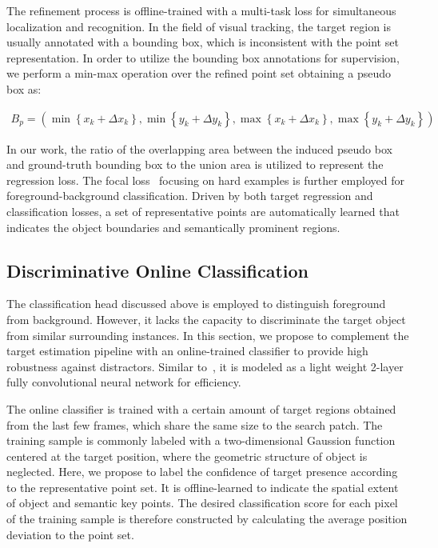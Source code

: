\documentclass[runningheads]{llncs}
\begin{document}
The refinement process is offline-trained with a multi-task loss for
simultaneous localization and recognition. In the field of visual
tracking, the target region is usually annotated with a bounding box,
which is inconsistent with the point set representation. In order to
utilize the bounding box annotations for supervision, we perform a
min-max operation over the refined point set obtaining a pseudo
box as:

\begin{align}
B_{p} = \left( \min\left\{ x_{k} +\Delta x_{k} \right\},\min\left\{ y_{k} +\Delta y_{k} \right\},\max\left\{ x_{k} +\Delta x_{k} \right\},\max\left\{ y_{k} +\Delta y_{k} \right\} \right)
\end{align}

In our work, the ratio of the overlapping area between the induced
pseudo box and ground-truth bounding box to the union area is utilized
to represent the regression loss. The focal loss~\cite{focalloss} focusing on hard
examples is further employed for foreground-background classification.
Driven by both target regression and classification losses, a set of
representative points are automatically learned that indicates the
object boundaries and semantically prominent regions.

\subsection{Discriminative Online Classification}
The classification head discussed above is employed to distinguish foreground from background. However, it lacks the capacity to
discriminate the target object from similar surrounding instances. In this section, we propose to complement the target estimation pipeline
 with an online-trained classifier to provide high robustness against
distractors. Similar to~\cite{atom,drol}, it is modeled as a light weight
2-layer fully convolutional neural network for efficiency.

The online classifier is trained with a certain amount of target regions
obtained from the last few frames, which share the same size to the
search patch. The training sample is commonly labeled with
a two-dimensional Gaussion function centered at the target position, where
the geometric structure of object is neglected. Here, we propose to
label the confidence of target presence according to the representative
point set. It is offline-learned to indicate the spatial extent of
object and semantic key points. The desired classification score for
each pixel of the training sample is therefore constructed by
calculating the average position deviation to the point set.
\end{document}
